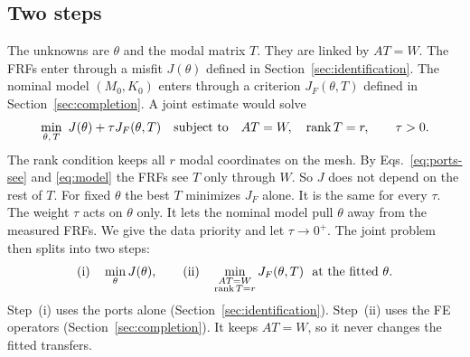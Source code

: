 \subsection{Two steps}
The unknowns are $\theta$ and the modal matrix $T$. They are linked by
$AT=W$. The FRFs enter through a misfit $J(\theta)$ defined in
Section~\ref{sec:identification}. The nominal model $(M_0,K_0)$ enters
through a criterion $J_F(\theta,T)$ defined in Section~\ref{sec:completion}.
A joint estimate would solve
\begin{equation}
 \min_{\theta,\,T}\ J(\theta)+\tau J_F(\theta,T)
 \quad\text{subject to}\quad AT=W,\quad\rank T=r,\qquad\tau>0.
 \label{eq:joint}
\end{equation}
The rank condition keeps all $r$ modal coordinates on the mesh. By
Eqs.~\eqref{eq:ports-see} and \eqref{eq:model} the FRFs see $T$ only
through $W$. So $J$ does not depend on the rest of $T$. For fixed $\theta$
the best $T$ minimizes $J_F$ alone. It is the same for every $\tau$. The
weight $\tau$ acts on $\theta$ only. It lets the nominal model pull $\theta$
away from the measured FRFs. We give the data priority and let
$\tau\to0^+$. The joint problem then splits into two steps:
\begin{equation}
 \text{(i)}\quad\min_\theta J(\theta),\qquad
 \text{(ii)}\quad\min_{\substack{AT=W\\\operatorname{rank} T=r}}J_F(\theta,T)\ \text{ at the fitted }\theta.
 \label{eq:two-steps}
\end{equation}
Step~(i) uses the ports alone (Section~\ref{sec:identification}). Step~(ii)
uses the FE operators (Section~\ref{sec:completion}). It keeps $AT=W$, so it
never changes the fitted transfers.
